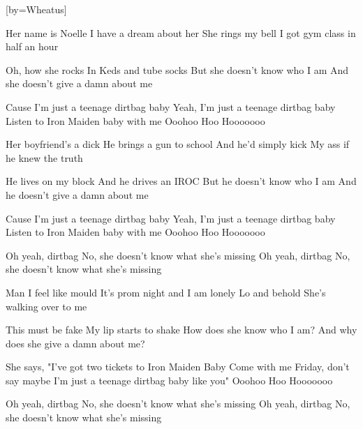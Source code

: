  

[by=Wheatus]




\beginverse
Her name is Noelle
I have a dream about her
She rings my bell
I got gym class in half an hour

Oh, how she rocks
In Keds and tube socks
But she doesn't know who I am
And she doesn't give a damn about me
\endverse

\beginchorus
Cause I'm just a teenage dirtbag baby
Yeah, I'm just a teenage dirtbag baby
Listen to Iron Maiden baby with me
Ooohoo Hoo Hooooooo
\endchorus

\beginverse
Her boyfriend's a dick
He brings a gun to school
And he'd simply kick
My ass if he knew the truth

He lives on my block
And he drives an IROC
But he doesn't know who I am
And he doesn't give a damn about me
\endverse

\beginchorus
Cause I'm just a teenage dirtbag baby
Yeah, I'm just a teenage dirtbag baby
Listen to Iron Maiden baby with me
Ooohoo Hoo Hooooooo

Oh yeah, dirtbag
No, she doesn't know what she's missing
Oh yeah, dirtbag
No, she doesn't know what she's missing
\endchorus

\beginverse
Man I feel like mould
It's prom night and I am lonely
Lo and behold
She's walking over to me

This must be fake
My lip starts to shake
How does she know who I am?
And why does she give a damn about me?

She says, "I've got two tickets to Iron Maiden Baby
Come with me Friday, don't say maybe
I'm just a teenage dirtbag baby like you"
Ooohoo Hoo Hooooooo
\endverse

\beginchorus
Oh yeah, dirtbag
No, she doesn't know what she's missing
Oh yeah, dirtbag
No, she doesn't know what she's missing
\endchorus


\endsong
